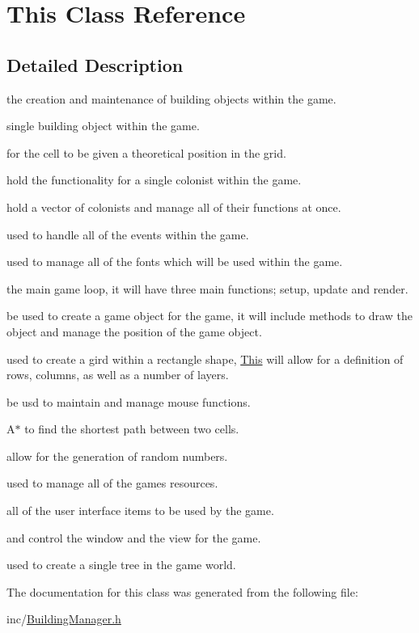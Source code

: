\hypertarget{class_this}{}\section{This Class Reference}
\label{class_this}


\subsection{Detailed Description}
the creation and maintenance of building objects within the game.

single building object within the game.

for the cell to be given a theoretical position in the grid.

hold the functionality for a single colonist within the game.

hold a vector of colonists and manage all of their functions at once.

used to handle all of the events within the game.

used to manage all of the fonts which will be used within the game.

the main game loop, it will have three main functions; setup, update and render.

be used to create a game object for the game, it will include methods to draw the object and manage the position of the game object.

used to create a gird within a rectangle shape, \mbox{\hyperlink{class_this}{This}} will allow for a definition of rows, columns, as well as a number of layers.

be usd to maintain and manage mouse functions.

A$\ast$ to find the shortest path between two cells.

allow for the generation of random numbers.

used to manage all of the games resources.

all of the user interface items to be used by the game.

and control the window and the view for the game.

used to create a single tree in the game world. 

The documentation for this class was generated from the following file\+:\begin{DoxyCompactItemize}
\item 
inc/\mbox{\hyperlink{_building_manager_8h}{Building\+Manager.\+h}}\end{DoxyCompactItemize}
